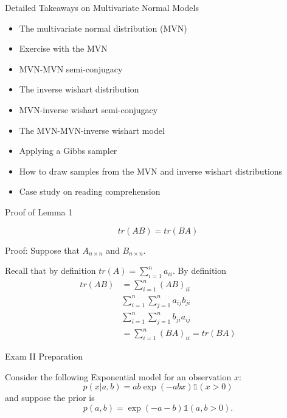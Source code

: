 \documentclass[
  ignorenonframetext,
]{beamer}
\providecommand{\tightlist}{%
  \setlength{\itemsep}{0pt}\setlength{\parskip}{0pt}}
\newcommand{\I}{\mathds{1}}
\begin{document}
\begin{frame}{Detailed Takeaways on Multivariate Normal Models}
\protect\hypertarget{detailed-takeaways-on-multivariate-normal-models}{}

\begin{itemize}
\tightlist
\item
  The multivariate normal distribution (MVN)
\item
  Exercise with the MVN
\item
  MVN-MVN semi-conjugacy
\item
  The inverse wishart distribution
\item
  MVN-inverse wishart semi-conjugacy
\item
  The MVN-MVN-inverse wishart model
\item
  Applying a Gibbs sampler
\item
  How to draw samples from the MVN and inverse wishart distributions
\item
  Case study on reading comprehension
\end{itemize}

\end{frame}

\begin{frame}{Proof of Lemma 1}
\protect\hypertarget{proof-of-lemma-1}{}

\[tr(AB) = tr(BA)\]

Proof: Suppose that \(A_{n \times n}\) and \(B_{n \times n}.\)

Recall that by definition \(tr(A) = \sum_{i=1}^n a_{ii}.\) By definition
\begin{align}
tr(AB) &= \sum_{i=1}^n (AB)_{ii} \\
& \sum_{i=1}^n \sum_{j=1}^n a_{ij} b_{ji}\\
& \sum_{i=1}^n \sum_{j=1}^n b_{ji} a_{ij} \\
&= \sum_{i=1}^n (BA)_{ii} 
= tr(BA)
\end{align}

\end{frame}

\begin{frame}{Exam II Preparation}
\protect\hypertarget{exam-ii-preparation}{}

Consider the following Exponential model for an observation \(x\):
\[ p(x|a,b) = a b \exp(- a b x) \I(x>0)\] and suppose the prior is
\[ p(a,b) = \exp(- a - b)\I(a,b>0). \]

\end{frame}
\end{document}
